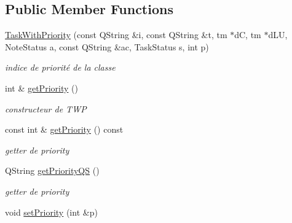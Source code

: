 \subsection*{Public Member Functions}
\begin{DoxyCompactItemize}
\item 
\mbox{\label{classTaskWithPriority_a7b0da02312ddf743f7119c1fb6202483}} 
\hyperlink{classTaskWithPriority_a7b0da02312ddf743f7119c1fb6202483}{Task\+With\+Priority} (const Q\+String \&i, const Q\+String \&t, tm $\ast$dC, tm $\ast$d\+LU, Note\+Status a, const Q\+String \&ac, Task\+Status s, int p)
\begin{DoxyCompactList}\small\item\em indice de priorité de la classe \end{DoxyCompactList}\item 
\mbox{\label{classTaskWithPriority_a18e66b621d0e9614b096ce11f03dee64}} 
int \& \hyperlink{classTaskWithPriority_a18e66b621d0e9614b096ce11f03dee64}{get\+Priority} ()
\begin{DoxyCompactList}\small\item\em constructeur de T\+WP \end{DoxyCompactList}\item 
\mbox{\label{classTaskWithPriority_ace8a1d270eb7efebfdb1321e0cc86081}} 
const int \& \hyperlink{classTaskWithPriority_ace8a1d270eb7efebfdb1321e0cc86081}{get\+Priority} () const
\begin{DoxyCompactList}\small\item\em getter de priority \end{DoxyCompactList}\item 
\mbox{\label{classTaskWithPriority_a5c6539bb82fa4a23cba89d47d493ee54}} 
Q\+String \hyperlink{classTaskWithPriority_a5c6539bb82fa4a23cba89d47d493ee54}{get\+Priority\+QS} ()
\begin{DoxyCompactList}\small\item\em getter de priority \end{DoxyCompactList}\item 
\mbox{\label{classTaskWithPriority_a9fb2a61da47d26ea236657f451be370d}} 
void \hyperlink{classTaskWithPriority_a9fb2a61da47d26ea236657f451be370d}{set\+Priority} (int \&p)

\end{DoxyCompactItemize}
